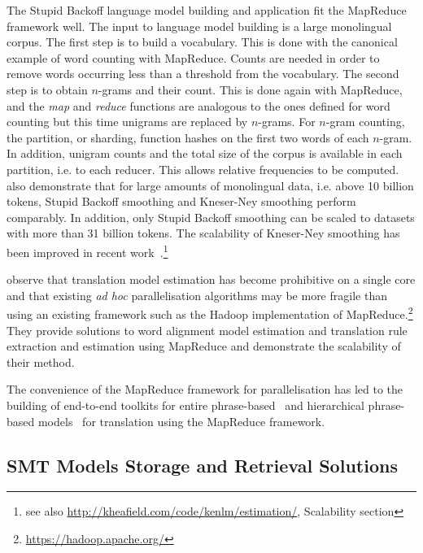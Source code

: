 The Stupid Backoff language model building and application fit the
MapReduce framework well. The input to language model building
is a large monolingual corpus. The first step is to build
a vocabulary. This is done with the canonical example of word
counting with MapReduce. Counts %
are needed in order to remove words occurring less than a threshold
from the vocabulary. The second step is to obtain $n$-grams and their
count. This is done again with MapReduce, and the \emph{map} and \emph{reduce}
functions are analogous to the ones defined for word counting but this time
unigrams are replaced by $n$-grams.
For $n$-gram counting, the partition, or sharding, function hashes
on the first two words of each $n$-gram. In addition, unigram counts
and the total size of the corpus is available in each partition, i.e.
to each reducer. This allows relative frequencies to be computed.
\citet{brants-popat-xu-och-dean:2007:EMNLP-CoNLL} also
demonstrate
that for large amounts of monolingual data, i.e. above 10 billion
tokens, Stupid Backoff smoothing and Kneser-Ney smoothing perform comparably.
In addition, only
Stupid Backoff smoothing can be scaled to datasets
with more than 31 billion tokens. The scalability of Kneser-Ney
smoothing has been improved in recent work~\citep{heafield-pouzyrevsky-clark-koehn:2013:ACL}.\footnote{see also \url{http://kheafield.com/code/kenlm/estimation/}, Scalability section}

\citet{dyer-cordova-mont-lin:2008:WMT}
observe that translation model estimation has become prohibitive
on a single core and that existing \emph{ad hoc} parallelisation
algorithms may be more fragile than using an existing framework such
as the Hadoop implementation of
MapReduce.\footnote{\url{https://hadoop.apache.org/}}
They provide solutions to word alignment model
estimation and translation rule extraction and estimation using MapReduce
and demonstrate the scalability of their method.

The convenience
of the MapReduce framework for parallelisation has led to the building
of end-to-end toolkits for entire phrase-based~\citep{gao-vogel:2010:PBML} and
hierarchical phrase-based models~\citep{venugopal-zollmann:2009:PBML}
for translation using the MapReduce framework.

\subsection{SMT Models Storage and Retrieval Solutions}

